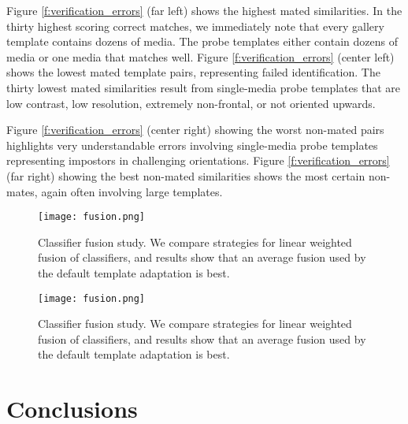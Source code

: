 \documentclass[10pt,twocolumn,letterpaper]{article}
\theoremstyle{definition}		\newtheorem{defn}[thm]{Definition}
\newcommand{\figwidth}{6.85in}
\newcommand{\ARXIV}{}
\begin{document}
Figure \ref{f:verification_errors} (far left) shows the highest mated similarities.  In the thirty highest scoring correct matches, we immediately note that every gallery template contains dozens of media. The probe templates either contain dozens of media or one media that matches well.  Figure \ref{f:verification_errors} (center left) shows the lowest mated template pairs, representing failed identification.  The thirty lowest mated similarities result from single-media probe templates that are low contrast, low resolution, extremely non-frontal, or not oriented upwards.
 
Figure \ref{f:verification_errors} (center right) showing the worst non-mated pairs highlights very understandable errors involving single-media probe templates representing impostors in challenging orientations.  Figure \ref{f:verification_errors} (far right) showing the best non-mated similarities shows the most certain non-mates, again often involving large templates.
 

\ifdefined\ARXIV
\begin{figure*}[!t]
\begin{centering}
\texttt{[image: fusion.png]} 
\caption{Classifier fusion study.  We compare strategies for linear weighted fusion of classifiers, and results show that an average fusion used by the default template adaptation is best.}  
\label{f:fusion}
\end{centering}
\end{figure*}

 \fi
\ifdefined\ECCV
\begin{figure*}[!t]
\begin{centering}
\texttt{[image: fusion.png]} 
\caption{Classifier fusion study.  We compare strategies for linear weighted fusion of classifiers, and results show that an average fusion used by the default template adaptation is best.}  
\label{f:fusion}
\end{centering}
\end{figure*}

 \fi













\section{Conclusions}
\end{document}
